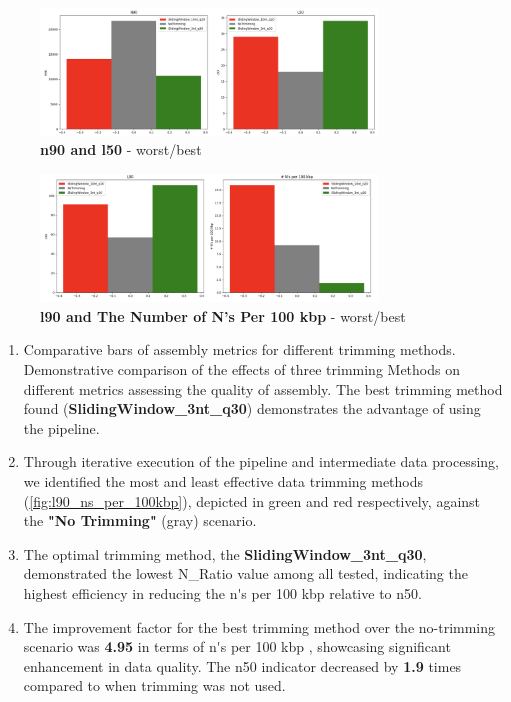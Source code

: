 \begin{figure}[!ht]
    \centering
    \includegraphics[width=0.8\textwidth]{resources/images/n90_l50.png}
    \caption{\textbf{\gls{n90} and \gls{l50}} - worst/best}
    \label{fig:n90_l50}
\end{figure}

\begin{figure}[!ht]
    \centering
    \includegraphics[width=0.8\textwidth]{resources/images/l90_ns_per_100kbp.png}
    \caption{\textbf{\gls{l90} and The Number of N's Per 100 kbp} - worst/best}
    \label{fig:l90_ns_per_100kbp}
\end{figure}


\begin{enumerate}
    \item{Comparative \gls{bar}s of \gls{assembly} metrics for different \gls{trimming} methods. Demonstrative comparison of the effects of three \gls{trimming} Methods on different metrics assessing the quality of \gls{assembly}. The best \gls{trimming} method found (\textbf{SlidingWindow\_3nt\_q30}) demonstrates the advantage of using the pipeline.}
    \item Through iterative execution of the pipeline and intermediate data processing, we identified the most and least effective data \gls{trimming} methods (\autoref{fig:l90_ns_per_100kbp}), depicted in green and red respectively, against the \textbf{"No Trimming"} (gray) scenario.
    \item The optimal \gls{trimming}  method, the  \textbf{SlidingWindow\_3nt\_q30}, demonstrated the lowest N\_Ratio value among all tested, indicating the highest efficiency in reducing the \gls{n's per 100 kbp}  relative to \gls{n50}.
    \item The improvement factor for the best \gls{trimming} method over the no-trimming scenario was \textbf{4.95} in terms of \gls{n's per 100 kbp} , showcasing significant enhancement in data quality. The \gls{n50}  indicator decreased by \textbf{1.9} times compared to when \gls{trimming}  was not used.
\end{enumerate}